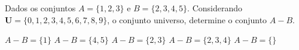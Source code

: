 \noindent\parbox{\linewidth}{

Dados os conjuntos $A=\{1,2,3\}$ e $B=\{2,3,4,5\}$. Considerando $\mathbf{U}=\{0,1,2,3,4,5,6,7,8,9\}$, o conjunto universo, determine o conjunto $A-B$.

$A-B=\{1\}$
$A-B=\{4,5\}$
$A-B=\{2,3\}$
$A-B=\{2,3,4\}$
$A-B=\{\}$




}


